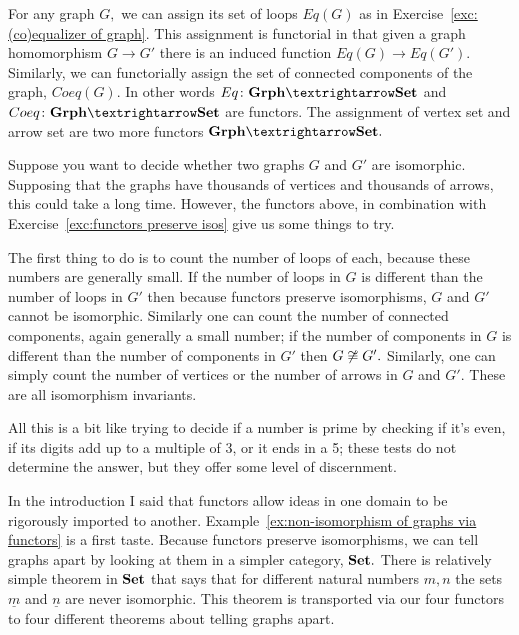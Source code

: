 \documentclass[../main/CT4S-EN-RU]{subfiles}
\begin{document}
\begin{exerciseRUS}\label{exc:functors preserve isos}
\end{exerciseRUS}

\begin{exampleENG}\label{ex:non-isomorphism of graphs via functors}
For any graph $G,$ we can assign its set of loops $Eq(G)$ as in Exercise~\ref{exc:(co)equalizer of graph}. This assignment is functorial in that given a graph homomorphism $G{→} G'$ there is an induced function $Eq(G){→} Eq(G').$ Similarly, we can functorially assign the set of connected components of the graph, $Coeq(G).$ In other words $Eq\colon\Grph{→}\Set$ and $Coeq\colon\Grph{→}\Set$ are functors. The assignment of vertex set and arrow set are two more functors $\Grph{→}\Set.$

Suppose you want to decide whether two graphs $G$ and $G'$ are isomorphic. Supposing that the graphs have thousands of vertices and thousands of arrows, this could take a long time. However, the functors above, in combination with Exercise~\ref{exc:functors preserve isos} give us some things to try.

The first thing to do is to count the number of loops of each, because these numbers are generally small. If the number of loops in $G$ is different than the number of loops in $G'$ then because functors preserve isomorphisms, $G$ and $G'$ cannot be isomorphic. Similarly one can count the number of connected components, again generally a small number; if the number of components in $G$ is different than the number of components in $G'$ then $G\not\cong G'.$ Similarly, one can simply count the number of vertices or the number of arrows in $G$ and $G'.$ These are all isomorphism invariants.  

All this is a bit like trying to decide if a number is prime by checking if it's even, if its digits add up to a multiple of 3, or it ends in a 5; these tests do not determine the answer, but they offer some level of discernment.
\end{exampleENG}

\begin{exampleRUS}\label{ex:non-isomorphism of graphs via functors}
\end{exampleRUS}

\begin{remarkENG}
In the introduction I said that functors allow ideas in one domain to be rigorously imported to another. Example~\ref{ex:non-isomorphism of graphs via functors} is a first taste. Because functors preserve isomorphisms, we can tell graphs apart by looking at them in a simpler category, ${\mathbf{Set}}.$ There is relatively simple theorem in ${\mathbf{Set}}$ that says that for different natural numbers $m,n$ the sets $\underline{m}$ and $\underline{n}$ are never isomorphic. This theorem is transported via our four functors to four different theorems about telling graphs apart.
\end{remarkENG}
\end{document}

